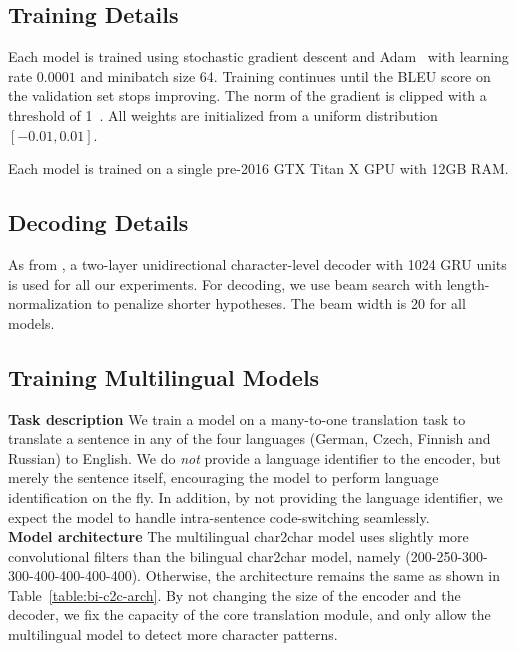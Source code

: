 \documentclass[11pt,letterpaper]{article}
\newcommand{\ti}{\textit}
\newcommand{\tb}{\textbf}
\begin{document}
    \subsection{Training Details}

    Each model is trained using stochastic gradient descent and Adam~\cite{Kingma:14} with learning rate $0.0001$ and minibatch size 64. Training continues until the BLEU score on the validation set stops improving. The norm of the gradient is clipped with a threshold of 1~\cite{Pascanu:13}. All weights are initialized from a uniform distribution $[-0.01, 0.01].$ 

    Each model is trained on a single pre-2016 GTX Titan X GPU with 12GB RAM.

    \subsection{Decoding Details}
    
    As from \cite{Chung:16}, a two-layer unidirectional character-level decoder with 1024 GRU units is used for all our experiments. For decoding, we use beam search with length-normalization to penalize shorter hypotheses. The beam width is 20 for all models.
    
    \subsection{Training Multilingual Models}

    \noindent\tb{Task description} We train a model on a many-to-one translation task to translate a sentence in any of the four languages (German, Czech, Finnish and Russian) to English. We do \ti{not} provide a language identifier to the encoder, but merely the sentence itself, encouraging the model to perform language identification on the fly. In addition, by not providing the language identifier, we expect the model to handle intra-sentence code-switching seamlessly. \\

    \noindent\tb{Model architecture} The multilingual char2char model uses slightly more convolutional filters than the bilingual char2char model, namely (200-250-300-300-400-400-400-400). Otherwise, the architecture remains the same as shown in Table~\ref{table:bi-c2c-arch}. By not changing the size of the encoder and the decoder, we fix the capacity of the core translation module, and only allow the multilingual model to detect more character patterns.
    
\end{document}
